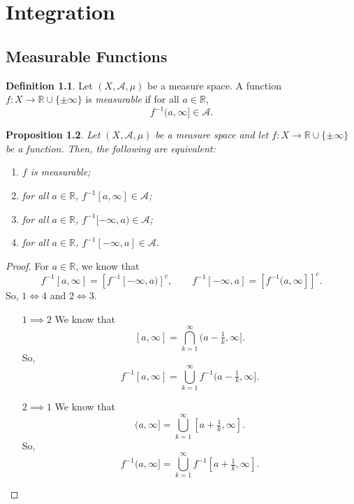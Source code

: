 \documentclass[a4paper, openany]{memoir}
\theoremstyle{definition}
\newtheorem{definition}{Definition}[section]
\theoremstyle{plain}
\newtheorem{proposition}[definition]{Proposition}
\begin{document}
    \chapter{Integration}
    \section{Measurable Functions}

    \begin{definition}
        Let $(X, \mathcal{A}, \mu)$ be a measure space. A function $f \colon X \to \mathbb{R} \cup \{\pm \infty\}$ is \emph{measurable} if for all $a \in \mathbb{R}$,
        \[f^{-1}(a, \infty] \in \mathcal{A}.\]
    \end{definition}

    \begin{proposition}
        Let $(X, \mathcal{A}, \mu)$ be a measure space and let $f \colon X \to \mathbb{R} \cup \{\pm \infty\}$ be a function. Then, the following are equivalent:
        \begin{enumerate}
            \item $f$ is measurable;
            \item for all $a \in \mathbb{R}$, $f^{-1}[a, \infty] \in \mathcal{A}$;
            \item for all $a \in \mathbb{R}$, $f^{-1}[-\infty, a) \in \mathcal{A}$;
            \item for all $a \in \mathbb{R}$, $f^{-1}[-\infty, a] \in \mathcal{A}$.
        \end{enumerate}
    \end{proposition}
    \begin{proof}
        For $a \in \mathbb{R}$, we know that
        \[f^{-1}[a, \infty] = [f^{-1}[-\infty, a)]^c, \qquad f^{-1}[-\infty, a] = [f^{-1}(a, \infty]]^c.\]
        So, $1 \iff 4$ and $2 \iff 3$. 
        \begin{itemize}
            \item[$1 \implies 2$] We know that
            \[[a, \infty] = \bigcap_{k=1}^\infty (a - \tfrac{1}{k}, \infty].\]
            So,
            \[f^{-1}[a, \infty] = \bigcup_{k=1}^\infty f^{-1} (a - \tfrac{1}{k}, \infty].\]

            \item[$2 \implies 1$] We know that
            \[(a, \infty] = \bigcup_{k=1}^\infty [a + \tfrac{1}{k}, \infty].\]
            So,
            \[f^{-1}(a, \infty] = \bigcup_{k=1}^\infty f^{-1} [a + \tfrac{1}{k}, \infty].\]
        \end{itemize}
    \end{proof}
\end{document}
